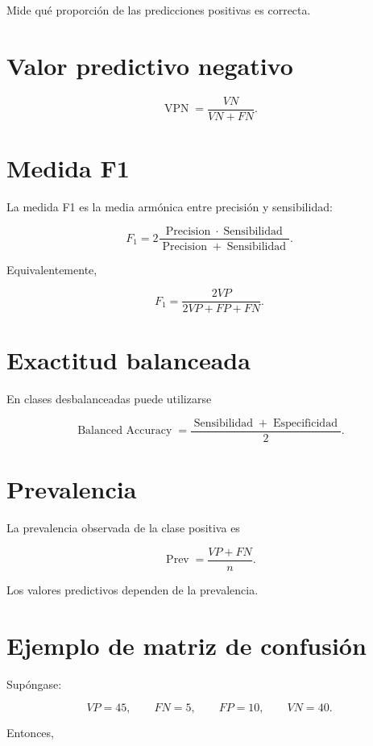 \documentclass[
  spanish,
  11pt,
  letterpaper,
  DIV=11,
  numbers=noendperiod]{scrreprt}
\theoremstyle{definition}
\theoremstyle{plain}
\theoremstyle{definition}
\theoremstyle{remark}
\begin{document}
Mide qué proporción de las predicciones positivas es correcta.

\section{Valor predictivo negativo}\label{valor-predictivo-negativo}

\[
\operatorname{VPN}
=
\frac{
VN
}{
VN+FN
}.
\]

\section{Medida F1}\label{medida-f1}

La medida F1 es la media armónica entre precisión y sensibilidad:

\[
F_1
=
2
\frac{
\operatorname{Precision}
\cdot
\operatorname{Sensibilidad}
}{
\operatorname{Precision}
+
\operatorname{Sensibilidad}
}.
\]

Equivalentemente,

\[
F_1
=
\frac{
2VP
}{
2VP+FP+FN
}.
\]

\section{Exactitud balanceada}\label{exactitud-balanceada}

En clases desbalanceadas puede utilizarse

\[
\operatorname{Balanced\ Accuracy}
=
\frac{
\operatorname{Sensibilidad}
+
\operatorname{Especificidad}
}{
2
}.
\]

\section{Prevalencia}\label{prevalencia}

La prevalencia observada de la clase positiva es

\[
\operatorname{Prev}
=
\frac{
VP+FN
}{
n
}.
\]

Los valores predictivos dependen de la prevalencia.

\section{Ejemplo de matriz de
confusión}\label{ejemplo-de-matriz-de-confusiuxf3n}

Supóngase:

\[
VP=45,
\qquad
FN=5,
\qquad
FP=10,
\qquad
VN=40.
\]

Entonces,
\end{document}
